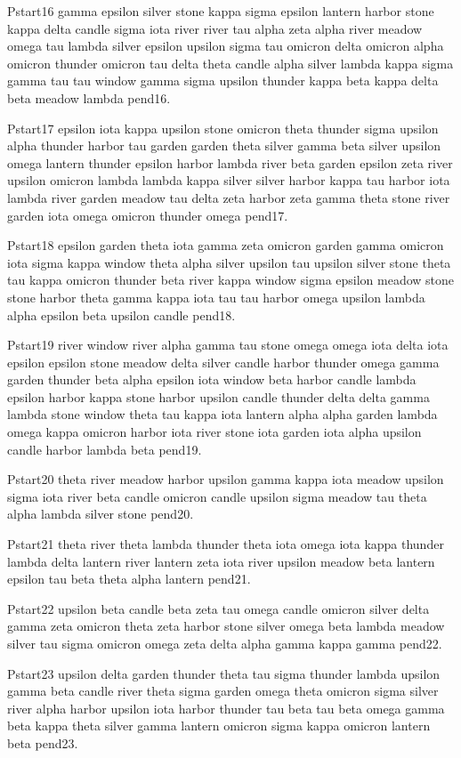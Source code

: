 \documentclass{article}
\begin{document}
Pstart16 gamma epsilon silver stone kappa sigma epsilon lantern harbor stone kappa delta candle sigma iota river river tau alpha zeta alpha river meadow omega tau lambda silver epsilon upsilon sigma tau omicron delta omicron alpha omicron thunder omicron tau delta theta candle alpha silver lambda kappa sigma gamma tau tau window gamma sigma upsilon thunder kappa beta kappa delta beta meadow lambda pend16.

Pstart17 epsilon iota kappa upsilon stone omicron theta thunder sigma upsilon alpha thunder harbor tau garden garden theta silver gamma beta silver upsilon omega lantern thunder epsilon harbor lambda river beta garden epsilon zeta river upsilon omicron lambda lambda kappa silver silver harbor kappa tau harbor iota lambda river garden meadow tau delta zeta harbor zeta gamma theta stone river garden iota omega omicron thunder omega pend17.

Pstart18 epsilon garden theta iota gamma zeta omicron garden gamma omicron iota sigma kappa window theta alpha silver upsilon tau upsilon silver stone theta tau kappa omicron thunder beta river kappa window sigma epsilon meadow stone stone harbor theta gamma kappa iota tau tau harbor omega upsilon lambda alpha epsilon beta upsilon candle pend18.

Pstart19 river window river alpha gamma tau stone omega omega iota delta iota epsilon epsilon stone meadow delta silver candle harbor thunder omega gamma garden thunder beta alpha epsilon iota window beta harbor candle lambda epsilon harbor kappa stone harbor upsilon candle thunder delta delta gamma lambda stone window theta tau kappa iota lantern alpha alpha garden lambda omega kappa omicron harbor iota river stone iota garden iota alpha upsilon candle harbor lambda beta pend19.

Pstart20 theta river meadow harbor upsilon gamma kappa iota meadow upsilon sigma iota river beta candle omicron candle upsilon sigma meadow tau theta alpha lambda silver stone pend20.

Pstart21 theta river theta lambda thunder theta iota omega iota kappa thunder lambda delta lantern river lantern zeta iota river upsilon meadow beta lantern epsilon tau beta theta alpha lantern pend21.

Pstart22 upsilon beta candle beta zeta tau omega candle omicron silver delta gamma zeta omicron theta zeta harbor stone silver omega beta lambda meadow silver tau sigma omicron omega zeta delta alpha gamma kappa gamma pend22.

Pstart23 upsilon delta garden thunder theta tau sigma thunder lambda upsilon gamma beta candle river theta sigma garden omega theta omicron sigma silver river alpha harbor upsilon iota harbor thunder tau beta tau beta omega gamma beta kappa theta silver gamma lantern omicron sigma kappa omicron lantern beta pend23.
\end{document}
